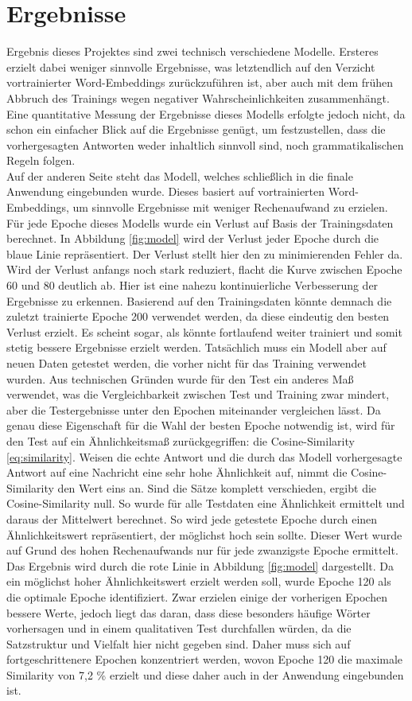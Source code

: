 \documentclass{aa}
\begin{document}
\section{Ergebnisse}
    Ergebnis dieses Projektes sind zwei technisch verschiedene Modelle. Ersteres erzielt dabei weniger sinnvolle Ergebnisse, was letztendlich auf den Verzicht vortrainierter Word-Embeddings zurückzuführen ist, aber auch mit dem frühen Abbruch des Trainings wegen negativer Wahrscheinlichkeiten zusammenhängt. Eine quantitative Messung der Ergebnisse dieses Modells erfolgte jedoch nicht, da schon ein einfacher Blick auf die Ergebnisse genügt, um festzustellen, dass die vorhergesagten Antworten weder inhaltlich sinnvoll sind, noch grammatikalischen Regeln folgen.\\
    Auf der anderen Seite steht das Modell, welches schließlich in die finale Anwendung eingebunden wurde. Dieses basiert auf vortrainierten Word-Embeddings, um sinnvolle Ergebnisse mit weniger Rechenaufwand zu erzielen. Für jede Epoche dieses Modells wurde ein Verlust auf Basis der Trainingsdaten berechnet. In Abbildung \ref{fig:model} wird der Verlust jeder Epoche durch die blaue Linie repräsentiert. Der Verlust stellt hier den zu minimierenden Fehler da. Wird der Verlust anfangs noch stark reduziert, flacht die Kurve zwischen Epoche 60 und 80 deutlich ab. Hier ist eine nahezu kontinuierliche Verbesserung der Ergebnisse zu erkennen. Basierend auf den Trainingsdaten könnte demnach die zuletzt trainierte Epoche 200 verwendet werden, da diese eindeutig den besten Verlust erzielt. Es scheint sogar, als könnte fortlaufend weiter trainiert und somit stetig bessere Ergebnisse erzielt werden. Tatsächlich muss ein Modell aber auf neuen Daten getestet werden, die vorher nicht für das Training verwendet wurden. Aus technischen Gründen wurde für den Test ein anderes Maß verwendet, was die Vergleichbarkeit zwischen Test und Training zwar mindert, aber die Testergebnisse unter den Epochen miteinander vergleichen lässt. Da genau diese Eigenschaft für die Wahl der besten Epoche notwendig ist, wird für den Test auf ein Ähnlichkeitsmaß zurückgegriffen: die Cosine-Similarity \eqref{eq:similarity}. Weisen die echte Antwort und die durch das Modell vorhergesagte Antwort auf eine Nachricht eine sehr hohe Ähnlichkeit auf, nimmt die Cosine-Similarity den Wert eins an. Sind die Sätze komplett verschieden, ergibt die Cosine-Similarity null. So wurde für alle Testdaten eine Ähnlichkeit ermittelt und daraus der Mittelwert berechnet. So wird jede getestete Epoche durch einen Ähnlichkeitswert repräsentiert, der möglichst hoch sein sollte. Dieser Wert wurde auf Grund des hohen Rechenaufwands nur für jede zwanzigste Epoche ermittelt. Das Ergebnis wird durch die rote Linie in Abbildung \ref{fig:model} dargestellt. Da ein möglichst hoher Ähnlichkeitswert erzielt werden soll, wurde Epoche 120 als die optimale Epoche identifiziert. Zwar erzielen einige der vorherigen Epochen bessere Werte, jedoch liegt das daran, dass diese besonders häufige Wörter vorhersagen und in einem qualitativen Test durchfallen würden, da die Satzstruktur und Vielfalt hier nicht gegeben sind. Daher muss sich auf fortgeschrittenere Epochen konzentriert werden, wovon Epoche 120 die maximale Similarity von 7,2 \% erzielt und diese daher auch in der Anwendung eingebunden ist.
    
\end{document}
